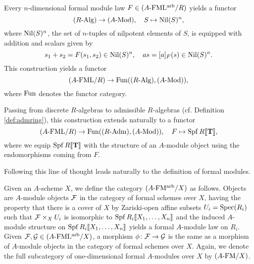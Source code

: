 \documentclass[../main.tex]{subfiles}
\begin{document}
Every $n$-dimensional formal module law $F \in {({A}\text-\allowbreak\mathrm{FML^{arb}}/{R})}$
yields a functor
\begin{equation}\label{eq:fmnilpfunc}
  {({R}\text-\allowbreak\mathrm{Alg})} \to {({A}\text-\allowbreak\mathrm{Mod})}, \quad S \mapsto {\operatorname{Nil}}(S)^n,
\end{equation}
where ${\operatorname{Nil}}(S)^n$, the set of $n$-tuples of nilpotent elements of $S$, is
equipped with addition and scalars given by 
\begin{equation*}
  s_1 + s_2 = F(s_1, s_2) \in {\operatorname{Nil}}(S)^n, \quad a s = [a]_F(s) \in {\operatorname{Nil}}(S)^n.
\end{equation*}
This construction yields a functor 
\begin{equation}\label{eq:formfunc}
  {({A}\text-\allowbreak\mathrm{FML}/{R})} \to \operatorname{Fun}({({R}\text-\allowbreak\mathrm{Alg})}, {({A}\text-\allowbreak\mathrm{Mod})}),
\end{equation}
where $\operatorname{Fun}$ denotes the functor category.

Passing from discrete $R$-algebras to admissible $R$-algebras (cf. Definition
\ref{def:admring}), this construction extends naturally to a functor 
\begin{equation*}
  {({A}\text-\allowbreak\mathrm{FML}/{R})} \to \operatorname{Fun} ({({R}\text-\allowbreak\mathrm{Adm})}, {({A}\text-\allowbreak\mathrm{Mod})}), \quad F \mapsto \operatorname{Spf} R\llbracket \mathbf{T} \rrbracket,
\end{equation*}
where we equip $\operatorname{Spf} R \llbracket \mathbf{T} \rrbracket$ with the structure of an $A$-module object
using the endomorphisms coming from $F$. 



Following this line of thought leads naturally to the definition of
formal modules. 

\begin{defi}
  Given an $A$-scheme $X$, we define the category
  ${({A}\text-\allowbreak\mathrm{FM^{arb}}/{X})}$ as follows. 
  Objects are $A$-module objects $\mathcal{F}$ in the category
  of formal schemes over $X$, having the property that 
  there is a cover of $X$ by Zariski-open affine subsets $U_i = \operatorname{Spec} (R_i)$
  such that $\mathcal{F} \times_X U_i$ is isomorphic to $\operatorname{Spf} R_i\llbracket X_1, \dots,
  X_n\rrbracket$ and the induced $A$-module structure on $\operatorname{Spf} R_i\llbracket X_1, \dots, X_n\rrbracket$
  yields a formal $A$-module law on $R_i$. Given $\mathcal{F}, \mathcal{G} \in {({A}\text-\allowbreak\mathrm{FML^{arb}}/{X})}$,
  a morphism $\phi\colon  \mathcal{F} \to \mathcal{G}$ is the same as a morphism of $A$-module objects 
  in the category of formal schemes over $X$.
  Again, we denote the full subcategory of one-dimensional formal $A$-modules
  over $X$ by ${({A}\text-\allowbreak\mathrm{FM}/{X})}$. 
\end{defi}

\end{document}
